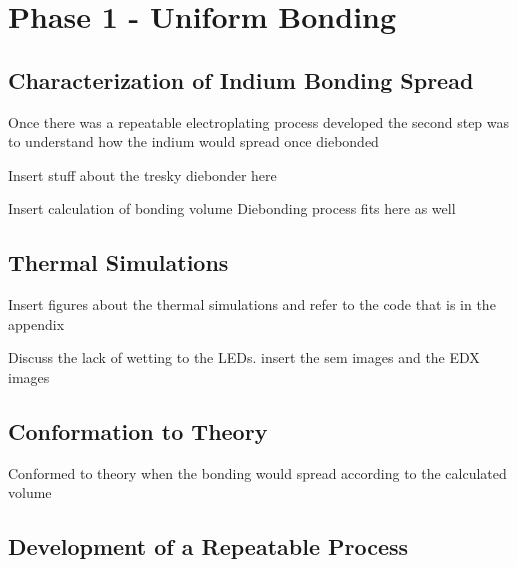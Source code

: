 \section{Phase 1 - Uniform Bonding}

\subsection{Characterization of Indium Bonding Spread}

Once there was a repeatable electroplating process developed the second step was to understand how the indium would spread once diebonded

Insert stuff about the tresky diebonder here

Insert calculation of bonding volume
Diebonding process fits here as well

\subsection{Thermal Simulations}

Insert figures about the thermal simulations and refer to the code that is in the appendix

Discuss the lack of wetting to the LEDs. insert the sem images and the EDX images

\subsection{Conformation to Theory}
Conformed to theory when the bonding would spread according to the calculated volume

\subsection{Development of a Repeatable Process}
